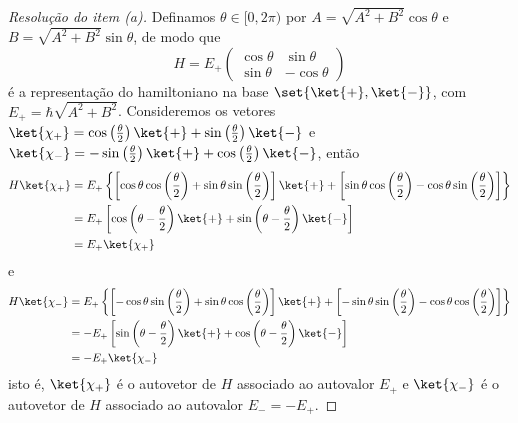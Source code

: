 \begin{proof}[Resolução do item (a)]
    Definamos \(\theta \in [0,2\pi)\) por \(A = \sqrt{A^2 + B^2}\cos\theta\) e \(B = \sqrt{A^2 + B^2}\sin\theta\), de modo que
    \begin{equation*}
        H = E_+ \begin{pmatrix}
            \cos\theta & \sin\theta\\
            \sin\theta & -\cos\theta
        \end{pmatrix}
    \end{equation*}
    é a representação do hamiltoniano na base \(\set{\ket{+},\ket{-}}\), com \(E_+ = \hbar\sqrt{A^2 +B^2}\). Consideremos os vetores \(\ket{\chi_+} = \cos\left(\frac\theta2\right)\ket{+} + \sin\left(\frac\theta2\right)\ket{-}\) e \(\ket{\chi_-} = -\sin\left(\frac\theta2\right)\ket{+} + \cos\left(\frac\theta2\right)\ket{-}\), então
    \begin{align*}
        H\ket{\chi_+} &= E_+\left\{\left[\cos\theta\cos\left(\frac\theta2\right) + \sin\theta\sin\left(\frac{\theta}2\right)\right]\ket{+} + \left[\sin\theta\cos\left(\frac\theta2\right) - \cos\theta\sin\left(\frac{\theta}2\right)\right]\right\}\\
                      &= E_+\left[\cos\left(\theta - \frac\theta2\right)\ket{+} + \sin\left(\theta - \frac{\theta}{2}\right)\ket{-}\right]\\
                      &= E_+\ket{\chi_+}
    \end{align*}
    e
    \begin{align*}
        H\ket{\chi_-} &= E_+\left\{\left[-\cos\theta\sin\left(\frac\theta2\right) + \sin\theta\cos\left(\frac{\theta}2\right)\right]\ket{+} + \left[-\sin\theta\sin\left(\frac\theta2\right) - \cos\theta\cos\left(\frac{\theta}2\right)\right]\right\}\\
                      &= -E_+\left[\sin\left(\theta - \frac\theta2\right)\ket{+} + \cos\left(\theta - \frac{\theta}{2}\right)\ket{-}\right]\\
                      &= -E_+\ket{\chi_-}
    \end{align*}
    isto é, \(\ket{\chi_+}\) é o autovetor de \(H\) associado ao autovalor \(E_+\) e \(\ket{\chi_-}\) é o autovetor de \(H\) associado ao autovalor \(E_- = - E_+\).
\end{proof}

